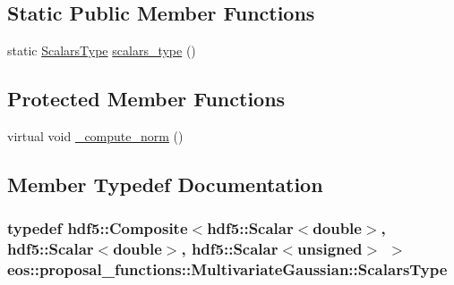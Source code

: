 \subsection*{Static Public Member Functions}
\begin{DoxyCompactItemize}
\item 
static \hyperlink{classeos_1_1hdf5_1_1Composite}{ScalarsType} \hyperlink{classeos_1_1proposal__functions_1_1MultivariateGaussian_aca175ee100311315c4ddb34757b68a3e}{scalars\_\-type} ()
\end{DoxyCompactItemize}
\subsection*{Protected Member Functions}
\begin{DoxyCompactItemize}
\item 
virtual void \hyperlink{classeos_1_1proposal__functions_1_1MultivariateGaussian_ac797f04a7bce3b029cfc32af0d6ecd07}{\_\-compute\_\-norm} ()
\end{DoxyCompactItemize}


\subsection{Member Typedef Documentation}
\hypertarget{classeos_1_1proposal__functions_1_1MultivariateGaussian_a434c13230be16d8d1f658f277a5b6c28}{
\subsubsection[{ScalarsType}]{\setlength{\rightskip}{0pt plus 5cm}typedef {\bf hdf5::Composite}$<${\bf hdf5::Scalar}$<$double$>$, {\bf hdf5::Scalar}$<$double$>$, {\bf hdf5::Scalar}$<$unsigned$>$ $>$ {\bf eos::proposal\_\-functions::MultivariateGaussian::ScalarsType}}}
\label{classeos_1_1proposal__functions_1_1MultivariateGaussian_a434c13230be16d8d1f658f277a5b6c28}


